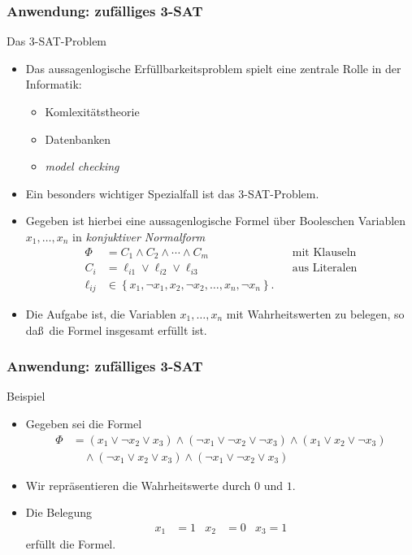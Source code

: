 \documentclass{beamer}
\title[Annuma]{\mytitle}
\author[Amin Coja-Oghlan]{Amin Coja-Oghlan}
\institute[Frankfurt]{JWGUFFM}
\date{}
\renewcommand{\emph}[1]{{\textcolor{solarizedRed}{\itshape #1}}}
\newcommand\bc[1]{\left({#1}\right)}
\newcommand\cbc[1]{\left\{{#1}\right\}}
\newcommand{\mytitle}{Anwendung: zuf\"alliges 3-SAT}
\begin{document}
\frame[plain]{\titlepage}

\begin{frame}\frametitle{\mytitle}
	\begin{block}{Das 3-SAT-Problem}
		\begin{itemize}
			\item Das aussagenlogische Erf\"ullbarkeitsproblem spielt eine zentrale Rolle in der Informatik:
			\begin{itemize}
			\item Komlexit\"atstheorie
			\item Datenbanken
			\item {\em model checking}
			\end{itemize}
\item Ein besonders wichtiger Spezialfall ist das 3-SAT-Problem.
\item Gegeben ist hierbei eine aussagenlogische Formel \"uber Booleschen Variablen $x_1,\ldots,x_n$ in \emph{konjuktiver Normalform}
		\begin{align*}
			\Phi&=C_1\wedge C_2\wedge\cdots\wedge C_m&&\mbox{mit Klauseln}\\
			C_i&=\ell_{i1}\vee\ell_{i2}\vee\ell_{i3}&&\mbox{aus Literalen}\\
			\ell_{ij}&\in\cbc{x_1,\neg x_1,x_2,\neg x_2,\ldots,x_n,\neg x_n}.
		\end{align*}
		\item Die Aufgabe ist, die Variablen $x_1,\ldots,x_n$ mit Wahrheitswerten zu belegen, so da\ss\ die Formel insgesamt erf\"ullt ist.
		\end{itemize}
	\end{block}
\end{frame}

\begin{frame}\frametitle{\mytitle}
	\begin{block}{Beispiel}
		\begin{itemize}
			\item Gegeben sei die Formel
				\begin{align*}
					\Phi&=\bc{x_1\vee\neg x_2\vee x_3}\wedge\bc{\neg x_1\vee\neg x_2\vee\neg x_3}\wedge\bc{x_1\vee x_2\vee\neg x_3}\\&\quad\wedge\bc{\neg x_1\vee x_2\vee x_3}\wedge\bc{\neg x_1\vee \neg x_2\vee x_3}
				\end{align*}
			\item Wir repr\"asentieren die Wahrheitswerte durch $0$ und $1$.
			\item Die Belegung
				\begin{align*}
					x_1&=1&x_2&=0&x_3=1
				\end{align*}
				erf\"ullt die Formel.
		\end{itemize}
	\end{block}
\end{frame}
\end{document}
